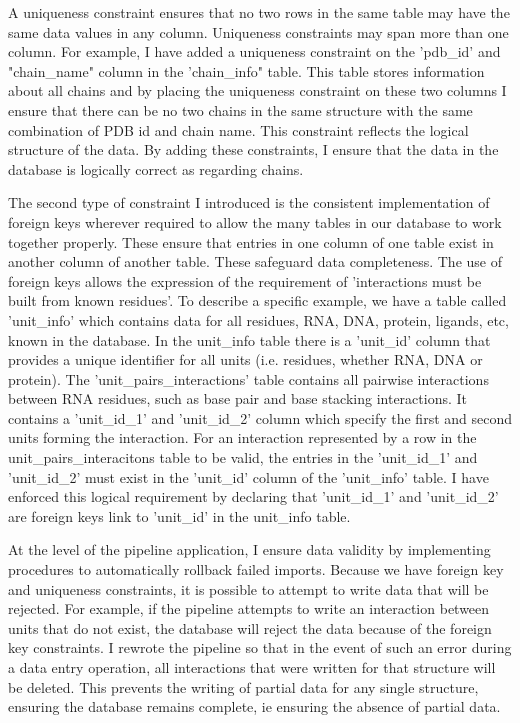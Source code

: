 A uniqueness constraint ensures that no two rows in the same table may have the
same data values in any column. Uniqueness constraints may span more than one
column. For example, I have added a uniqueness constraint on the 'pdb\_id' and
"chain\_name" column in the 'chain\_info" table. This table stores information
about all chains and by placing the uniqueness constraint on these two columns I
ensure that there can be no two chains in the same structure with the same
combination of PDB id and chain name. This constraint reflects the logical
structure of the data. By adding these constraints, I ensure that the data in
the database is logically correct as regarding chains.

The second type of constraint I introduced is the consistent implementation of
foreign keys wherever required to allow the many tables in our database to work
together properly. These ensure that entries in one column of one table exist in
another column of another table. These safeguard data completeness. The use of
foreign keys allows the expression of the requirement of 'interactions must be
built from known residues'. To describe a specific example, we have a table
called 'unit\_info' which contains data for all residues, RNA, DNA, protein,
ligands, etc, known in the database. In the unit\_info table there is a
'unit\_id' column that provides a unique identifier for all units (i.e.
residues, whether RNA, DNA or protein). The 'unit\_pairs\_interactions' table
contains all pairwise interactions between RNA residues, such as base pair and
base stacking interactions. It contains a 'unit\_id\_1' and 'unit\_id\_2' column
which specify the first and second units forming the interaction. For an
interaction represented by a row in the unit\_pairs\_interacitons table to be
valid, the entries in the 'unit\_id\_1' and 'unit\_id\_2' must exist  in the
'unit\_id' column of the 'unit\_info' table. I have enforced this logical
requirement by declaring that 'unit\_id\_1' and 'unit\_id\_2' are foreign keys
link to 'unit\_id' in the unit\_info table.

At the level of the pipeline application, I ensure data validity by implementing
procedures to automatically rollback failed imports. Because we have foreign key
and uniqueness constraints, it is possible to attempt to write data that will be
rejected. For example, if the pipeline attempts to write an interaction between
units that do not exist, the database will reject the data because of the
foreign key constraints. I rewrote the pipeline so that in the event of such an
error during a data entry operation, all interactions that were written for that
structure will be deleted. This prevents the writing of partial data for any
single structure, ensuring the database remains complete, ie ensuring the
absence of partial data.

